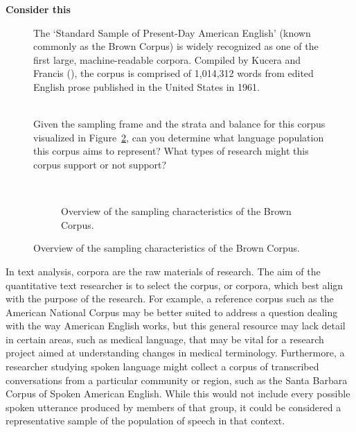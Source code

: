 \documentclass[
  letterpaper,
  DIV=11,
  numbers=noendperiod]{scrreprt}
\theoremstyle{definition}
\theoremstyle{remark}
\begin{document}
\begin{tcolorbox}[enhanced jigsaw, leftrule=.75mm, colframe=quarto-callout-color-frame, colback=white, rightrule=.15mm, opacityback=0, arc=.35mm, breakable, bottomrule=.15mm, left=2mm, toprule=.15mm]

\textbf{ Consider this}

\begin{figure}[H]

\begin{minipage}{0.48\linewidth}
The `Standard Sample of Present-Day American English' (known commonly as
the Brown Corpus) is widely recognized as one of the first large,
machine-readable corpora. Compiled by Kucera and Francis
(), the corpus is comprised of 1,014,312
words from edited English prose published in the United States in
1961.\\
\strut \\
Given the sampling frame and the strata and balance for this corpus
visualized in Figure~\ref{fig-ud-brown-distribution}, can you determine
what language population this corpus aims to represent? What types of
research might this corpus support or not support?\end{minipage}%
%
\begin{minipage}{0.03\linewidth}
~\end{minipage}%
%
\begin{minipage}{0.48\linewidth}

\begin{figure}[H]


\caption{\label{fig-ud-brown-distribution}Overview of the sampling
characteristics of the Brown Corpus.}

\end{figure}%

\end{minipage}%

\end{figure}%

\end{tcolorbox}

In text analysis, corpora are the raw materials of research. The aim of
the quantitative text researcher is to select the corpus, or corpora,
which best align with the purpose of the research. For example, a
reference corpus such as the American National Corpus may be better
suited to address a question dealing with the way American English
works, but this general resource may lack detail in certain areas, such
as medical language, that may be vital for a research project aimed at
understanding changes in medical terminology. Furthermore, a researcher
studying spoken language might collect a corpus of transcribed
conversations from a particular community or region, such as the Santa
Barbara Corpus of Spoken American English. While this would not include
every possible spoken utterance produced by members of that group, it
could be considered a representative sample of the population of speech
in that context.
\end{document}
